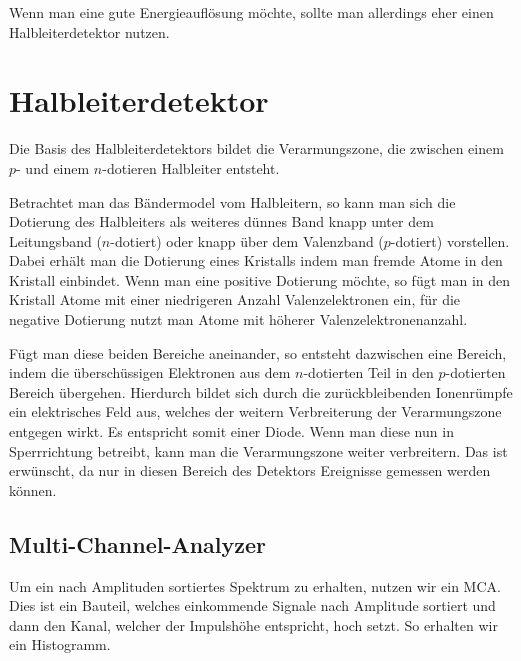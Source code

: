 \documentclass[11pt, ngerman, fleqn, DIV=15, headinclude, BCOR=2cm]{scrreprt}
\begin{document}
Wenn man eine gute Energieauflösung möchte, sollte man allerdings eher einen
Halbleiterdetektor nutzen.


\section{Halbleiterdetektor}

Die Basis des Halbleiterdetektors bildet die Verarmungszone, die zwischen einem
$p$- und einem $n$-dotieren Halbleiter entsteht.

Betrachtet man das Bändermodel vom Halbleitern, so kann man sich die Dotierung
des Halbleiters als weiteres dünnes Band knapp unter dem Leitungsband
($n$-dotiert) oder knapp über dem Valenzband ($p$-dotiert) vorstellen.
Dabei erhält man die Dotierung eines Kristalls indem man fremde Atome in den
Kristall einbindet.
Wenn man eine positive Dotierung möchte, so fügt man in den Kristall Atome mit
einer niedrigeren Anzahl Valenzelektronen ein, für die negative Dotierung nutzt
man Atome mit höherer Valenzelektronenanzahl.

Fügt man diese beiden Bereiche aneinander, so entsteht dazwischen eine Bereich,
indem die überschüssigen Elektronen aus dem $n$-dotierten Teil in den
$p$-dotierten Bereich übergehen.
Hierdurch bildet sich durch die zurückbleibenden Ionenrümpfe ein elektrisches Feld aus, welches
der weitern Verbreiterung der Verarmungszone entgegen wirkt.
Es entspricht somit einer Diode.
Wenn man diese nun in Sperrrichtung betreibt, kann man die Verarmungszone weiter
verbreitern.
Das ist erwünscht, da nur in diesen Bereich des Detektors Ereignisse
gemessen werden können.

\subsection{Multi-Channel-Analyzer}

Um ein nach Amplituden sortiertes Spektrum zu erhalten, nutzen wir ein MCA.
Dies ist ein Bauteil, welches einkommende Signale nach Amplitude sortiert und
dann den Kanal, welcher der Impulshöhe entspricht, hoch setzt. So erhalten wir ein
Histogramm.


\end{document}
